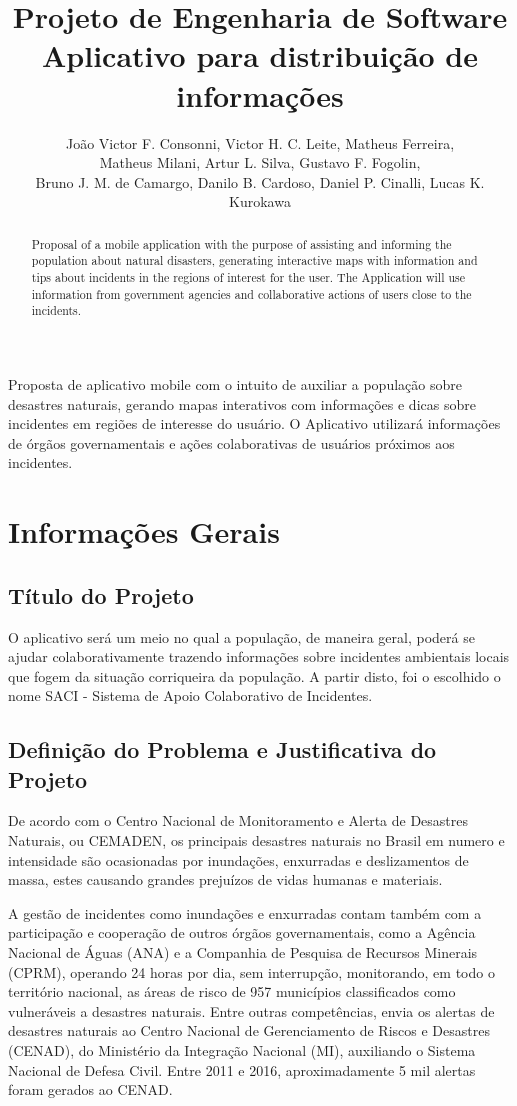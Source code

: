 \documentclass[12pt]{article}
\title{Projeto de Engenharia de Software\\ Aplicativo para distribuição de informações}
\author{João Victor F. Consonni\inst{1}, Victor H. C. Leite\inst{1}, Matheus Ferreira\inst{1}, \\Matheus Milani\inst{1}, Artur L. Silva\inst{1}, Gustavo F. Fogolin\inst{1}, \\Bruno J. M. de Camargo\inst{1}, Danilo B. Cardoso\inst{1}, Daniel P. Cinalli\inst{1}, Lucas K. Kurokawa\inst{1}}
\begin{document}
 

\maketitle

\begin{abstract}
Proposal of a mobile application with the purpose of assisting and informing the population about natural disasters, generating interactive maps with information and tips about incidents in the regions of interest for the user. The Application will use information from government agencies and collaborative actions of users close to the incidents.
\end{abstract} 
  
\begin{resumo} 
  Proposta de aplicativo mobile com o intuito de auxiliar a população sobre desastres naturais, gerando mapas interativos com informações e dicas sobre incidentes em regiões de interesse do usuário. O Aplicativo utilizará informações de órgãos governamentais e ações colaborativas de usuários próximos aos incidentes.
\end{resumo}


\section{Informações Gerais}
\subsection{Título do Projeto}

O aplicativo será um meio no qual a população, de maneira geral, poderá se ajudar colaborativamente trazendo informações sobre incidentes ambientais locais que fogem da situação corriqueira da população. A partir disto, foi o escolhido o nome SACI - Sistema de Apoio Colaborativo de Incidentes. 

\subsection{Definição do Problema e Justificativa do Projeto}

De acordo com o Centro Nacional de Monitoramento e Alerta de Desastres Naturais, ou CEMADEN, os principais desastres naturais no Brasil em numero e intensidade são ocasionadas por inundações, enxurradas e deslizamentos de massa, estes causando grandes prejuízos de vidas humanas e materiais.

A gestão de incidentes como inundações e enxurradas contam também com a participação e cooperação de outros órgãos governamentais, como a Agência Nacional de Águas (ANA) e a Companhia de Pesquisa de Recursos Minerais (CPRM), operando 24 horas por dia, sem interrupção, monitorando, em todo o território nacional, as áreas de risco de 957 municípios classificados como vulneráveis a desastres naturais. Entre outras competências, envia os alertas de desastres naturais ao Centro Nacional de Gerenciamento de Riscos e Desastres (CENAD), do Ministério da Integração Nacional (MI), auxiliando o Sistema Nacional de Defesa Civil. Entre 2011 e 2016, aproximadamente 5 mil alertas foram gerados ao CENAD. %
\end{document}
